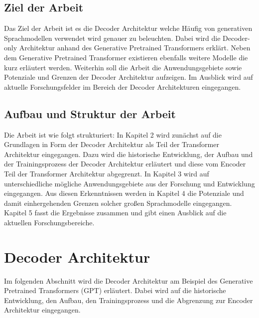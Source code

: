 \documentclass[conference]{IEEEtran}
\begin{document}
\subsection{Ziel der Arbeit}
Das Ziel der Arbeit ist es die Decoder Architektur welche Häufig von generativen Sprachmodellen verwendet wird genauer zu beleuchten. Dabei wird die Decoder-only Architektur anhand des Generative Pretrained Transformers erklärt. Neben dem Generative Pretrained Transformer existieren ebenfalls weitere Modelle die kurz erläutert werden. Weiterhin soll die Arbeit die Anwendungsgebiete sowie Potenziale und Grenzen der Decoder Architektur aufzeigen. Im Ausblick wird auf aktuelle Forschungsfelder im Bereich der Decoder Architekturen eingegangen.
\subsection{Aufbau und Struktur der Arbeit}
Die Arbeit ist wie folgt strukturiert: In Kapitel 2 wird zunächst auf die Grundlagen in Form der Decoder Architektur als Teil der Transformer Architektur eingegangen. Dazu wird die historische Entwicklung, der Aufbau und der Trainingsprozess der Decoder Architektur erläutert und diese vom Encoder Teil der Transformer Architektur abgegrenzt. In Kapitel 3 wird auf unterschiedliche mögliche Anwendungsgebiete aus der Forschung und Entwicklung eingegangen. Aus diesen Erkenntnissen werden in Kapitel 4 die Potenziale und damit einhergehenden Grenzen solcher großen Sprachmodelle eingegangen. Kapitel 5 fasst die Ergebnisse zusammen und gibt einen Ausblick auf die aktuellen Forschungsbereiche.
\section{Decoder Architektur}
Im folgenden Abschnitt wird die Decoder Architektur am Beispiel des Generative Pretrained Transformers (GPT) erläutert. Dabei wird auf die historische Entwicklung, den Aufbau, den Trainingsprozess und die Abgrenzung zur Encoder Architektur eingegangen.
\end{document}
